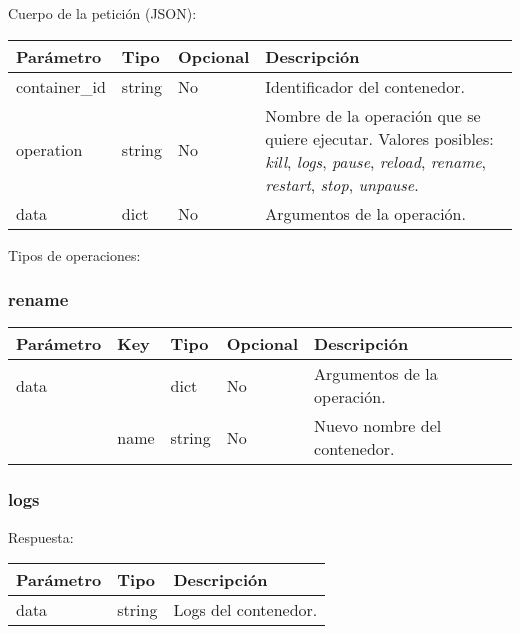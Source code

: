 		Cuerpo de la petición (JSON):
		\begin{table}[!h]
			\centering
	\begin{adjustbox}{max width=\textwidth}
			\begin{tabular}{|l|l|l|l|}
				\hline
				Parámetro & Tipo & Opcional & Descripción \\ \hline
				container\_id & string & No & Identificador del contenedor. \\ \hline
				operation & string & No & Nombre de la operación que se quiere ejecutar. Valores posibles: \textit{kill}, \textit{logs}, \textit{pause}, \textit{reload}, \textit{rename}, \textit{restart}, \textit{stop}, \textit{unpause}. \\ \hline
				data & dict & No & Argumentos de la operación. \\ \hline
			\end{tabular}
\end{adjustbox}
		\end{table}
	
		Tipos de operaciones:
		
		\subsubsection{rename}
			\begin{table}[!h]
				\centering
	\begin{adjustbox}{max width=\textwidth}
				\begin{tabular}{|l|l|l|l|l|}
					\hline
					Parámetro & Key & Tipo & Opcional & Descripción \\ \hline
					data &  & dict & No & Argumentos de la operación. \\ \hline
					& name & string & No & Nuevo nombre del contenedor. \\ \hline
				\end{tabular}
\end{adjustbox}
			\end{table}
		
		\subsubsection{logs}
			Respuesta:
			
			\begin{table}[!h]
				\centering
	\begin{adjustbox}{max width=\textwidth}
				\begin{tabular}{|l|l|l|}
					\hline
					Parámetro & Tipo & Descripción \\ \hline
					data & string & Logs del contenedor. \\ \hline
				\end{tabular}
\end{adjustbox}
			\end{table}
		
